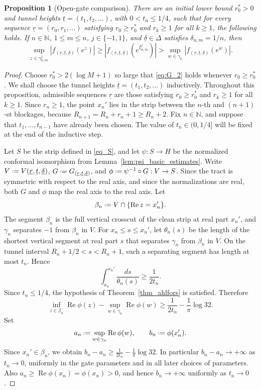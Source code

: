 \documentclass[a4paper, 11pt, reqno]{amsart}
\numberwithin{equation}{section}
\theoremstyle{plain}
\newtheorem{proposition}[theorem]{Proposition}
\newcommand*{\defeq}{\mathrel{\vcenter{\baselineskip0.5ex \lineskiplimit0pt
 \hbox{\scriptsize.}\hbox{\scriptsize.}}}=}
\theoremstyle{remark}
\newcommand{\N}{{\mathbb{N}}}
\newcommand{\uldelta}{\underline{\delta}}
\newcommand{\ulr}{\underline{r}}
\newcommand{\ult}{\underline{t}}
\newcommand{\Rea}{\operatorname{Re }}
\begin{document}
\begin{proposition}[Open-gate comparison]\label{prop_fixing_tn}
	There are an initial lower bound \(r_0^*>0\) and tunnel heights \(\ult=(t_1,t_2,\ldots)\), with \(0<t_n\leq1/4\), such that for every sequence \(\ulr=(r_0,r_1,\ldots)\) satisfying \(r_0\ge r_0^*\) and \(r_k\ge1\) for all \(k\ge1\), the following holds. If \(n\in\N\), \(1\leq m\leq n\), \(j\in\{-1,1\}\), and \(\uldelta\in\Delta\) satisfies \(\delta_{n,m}=1/n\), then
	\[
	\sup_{z\in\gamma^j_{n,m}}|f_{(\ulr,\ult,\uldelta)}(e^z)|
	\geq
	|f_{(\ulr,\ult,\uldelta)}(e^{\xi^j_{n,m}})|
	>
	\sup_{w\in\gamma_n}|f_{(\ulr,\ult,\uldelta)}(e^w)|.
	\]
\end{proposition}
\begin{proof}
	Choose \(r_0^*>2(\log M+1)\) so large that \eqref{eq:G_2}
	holds whenever \(r_0\ge r_0^*\). We shall choose the tunnel heights
	\(\ult=(t_1,t_2,\ldots)\) inductively. Throughout this proposition, admissible sequences \(\ulr\) are those satisfying \(r_0\ge r_0^*\) and \(r_k\ge1\) for all \(k\ge1\). Since \(r_n\ge1\), the point \(x_n'\) lies in the strip between the \(n\)-th and \((n+1)\)-st blockages,
	because \(R_{n+1}=R_n+r_n+1\ge R_n+2\). Fix \(n\in\N\), and suppose that \(t_1,\ldots,t_{n-1}\) have already been chosen. The value of \(t_n\in(0,1/4]\) will be fixed at the end of the inductive step.
	
	Let \(S\) be the strip defined in \eqref{eq_S}, and let
	\(\psi:S\to H\) be the normalized conformal isomorphism from
	Lemma~\ref{lem:psi_basic_estimates}. Write  \(V\defeq V(\ulr,\ult,\uldelta)\),
	\(G\defeq G_{(\ulr,\ult,\uldelta)}\), and
	\(\phi\defeq\psi^{-1}\circ G:V\to S\). Since the tract is symmetric with
	respect to the real axis, and since the normalizations are real, both
	\(G\) and \(\phi\) map the real axis to the real axis. Let
	\[
	\beta_n\defeq V\cap\{\Rea z=x_n'\}.
	\]
	The segment \(\beta_n\) is the full vertical crosscut of the clean strip at real part \(x_n'\), and \(\gamma_n\) separates \(-1\) from \(\beta_n\) in \(V\).  For \(x_n\le s\le x_n'\), let \(\theta_n(s)\) be the length of the
	shortest vertical segment at real part \(s\) that separates \(\gamma_n\)
	from \(\beta_n\) in \(V\). On the tunnel interval
	\(R_n+1/2<s<R_n+1\), such a separating segment has length at most \(t_n\).
	Hence
	\[
	\int_{x_n}^{x_n'}\frac{ds}{\theta_n(s)}
	\ge \frac{1}{2t_n}.
	\]	
	Since \(t_n\le1/4\), the hypothesis of Theorem~\ref{thm_ahlfors} is
	satisfied. Therefore
	\[
	\inf_{z\in\beta_n}\Rea\phi(z)
	-
	\sup_{w\in\gamma_n}\Rea\phi(w)
	\ge
	\frac{1}{2t_n}-\frac1\pi\log32.
	\]
	Set
	\[
	a_n\defeq\sup_{w\in\gamma_n}\Rea\phi(w),
	\qquad
	b_n\defeq\phi(x_n').
	\]
	Since \(x_n'\in\beta_n\), we obtain
	$
	b_n-a_n\ge \frac{1}{2t_n}-\frac1\pi\log32.
	$
	In particular \(b_n-a_n\to+\infty\) as \(t_n\to0\), uniformly in the gate
	parameters and in all later choices of parameters. Also \(a_n\ge\Rea\phi(x_n)=\phi(x_n)>0\), and hence \(b_n\to+\infty\)
	uniformly as \(t_n\to0\).
	

\end{proof}
\end{document}
